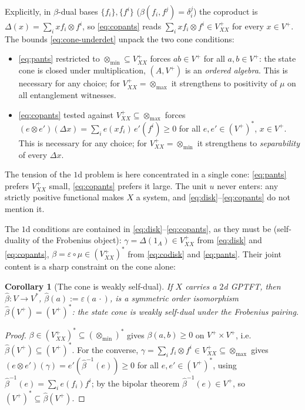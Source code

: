 \documentclass[prl,aps,10pt,superscriptaddress, floatfix]{revtex4-2}
\newtheorem{coro}{Corollary}
\begin{document}
Explicitly, in $\beta$-dual bases $\{f_i\},\{f^i\}$ ($\beta(f_i,f^j)=\delta_i^j$) the coproduct is $\Delta(x)=\sum_i xf_i\otimes f^i$, so \eqref{eq:copants} reads $\sum_i xf_i\otimes f^i\in V^+_{XX}$ for every $x\in V^+$. The bounds \eqref{eq:cone-underdet} unpack the two cone conditions:
\begin{itemize}
\item \eqref{eq:pants} restricted to $\otimes_{\min}\subseteq V^+_{XX}$ forces $ab\in V^+$ for all $a,b\in V^+$: the state cone is closed under multiplication, $(A,V^+)$ is an \emph{ordered algebra}. This is necessary for any choice; for $V^+_{XX}=\otimes_{\max}$ it strengthens to positivity of $\mu$ on all entanglement witnesses.
\item \eqref{eq:copants} tested against $V^+_{XX}\subseteq\otimes_{\max}$ forces $(e\otimes e')(\Delta x)=\sum_ie(xf_i)\,e'(f^i)\ge0$ for all $e,e'\in(V^+)^*$, $x\in V^+$. This is necessary for any choice; for $V^+_{XX}=\otimes_{\min}$ it strengthens to \emph{separability} of every $\Delta x$.
\end{itemize}
The tension of the $1$d problem is here concentrated in a single cone: \eqref{eq:pants} prefers $V^+_{XX}$ small, \eqref{eq:copants} prefers it large. The unit $u$ never enters: any strictly positive functional makes $X$ a system, and \eqref{eq:disk}--\eqref{eq:copants} do not mention it.

The $1$d conditions are contained in \eqref{eq:disk}--\eqref{eq:copants}, as they must be (self-duality of the Frobenius object): $\gamma=\Delta(1_A)\in V^+_{XX}$ from \eqref{eq:disk} and \eqref{eq:copants}, $\beta=\varepsilon\circ\mu\in(V^+_{XX})^*$ from \eqref{eq:codisk} and \eqref{eq:pants}. Their joint content is a sharp constraint on the cone alone:

\begin{coro}[The cone is weakly self-dual]\label{coro:selfdual}
If $X$ carries a $2$d GPTFT, then $\hat\beta:V\to V^*$, $\hat\beta(a):=\varepsilon(a\,\cdot)$, is a \emph{symmetric} order isomorphism $\hat\beta(V^+)=(V^+)^*$: the state cone is weakly self-dual under the Frobenius pairing.
\end{coro}

\begin{proof}
$\beta\in(V^+_{XX})^*\subseteq(\otimes_{\min})^*$ gives $\beta(a,b)\ge0$ on $V^+\times V^+$, i.e.\ $\hat\beta(V^+)\subseteq(V^+)^*$. For the converse, $\gamma=\sum_if_i\otimes f^i\in V^+_{XX}\subseteq\otimes_{\max}$ gives $(e\otimes e')(\gamma)=e'(\hat\beta^{-1}(e))\ge0$ for all $e,e'\in(V^+)^*$, using $\hat\beta^{-1}(e)=\sum_ie(f_i)f^i$; by the bipolar theorem $\hat\beta^{-1}(e)\in V^+$, so $(V^+)^*\subseteq\hat\beta(V^+)$.
\end{proof}
\end{document}
